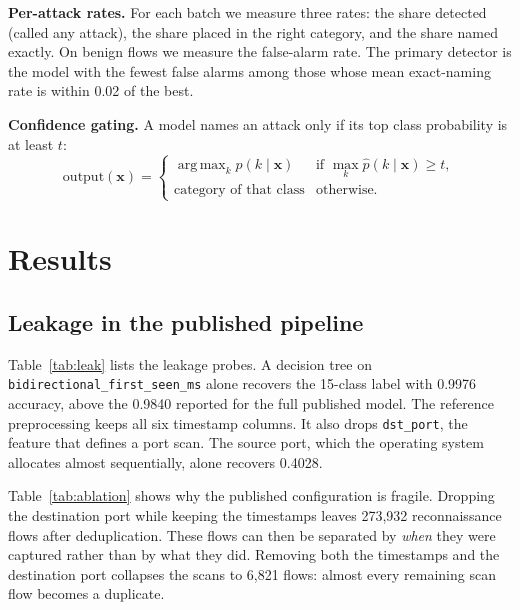 \documentclass[conference]{IEEEtran}
\newcommand{\col}[1]{\texttt{\small #1}}
\DeclareMathOperator*{\argmax}{arg\,max}
\begin{document}
\textbf{Per-attack rates.} For each batch we measure three rates: the share detected (called any attack), the share placed in the right category, and the share named exactly. On benign flows we measure the false-alarm rate. The primary detector is the model with the fewest false alarms among those whose mean exact-naming rate is within 0.02 of the best.

\textbf{Confidence gating.} A model names an attack only if its top class probability is at least $t$:
\begin{equation}
\text{output}(\mathbf{x}) =
\begin{cases}
\argmax_k \hat{p}(k\mid\mathbf{x}) & \text{if } \max_k \hat{p}(k\mid\mathbf{x}) \ge t,\\
\text{category of that class} & \text{otherwise.}
\end{cases}
\label{eq:gate}
\end{equation}

\section{Results}
\label{sec:results}

\subsection{Leakage in the published pipeline}

Table~\ref{tab:leak} lists the leakage probes. A decision tree on \col{bidirectional\_first\_seen\_ms} alone recovers the 15-class label with 0.9976 accuracy, above the 0.9840 reported for the full published model. The reference preprocessing keeps all six timestamp columns. It also drops \col{dst\_port}, the feature that defines a port scan. The source port, which the operating system allocates almost sequentially, alone recovers 0.4028.

Table~\ref{tab:ablation} shows why the published configuration is fragile. Dropping the destination port while keeping the timestamps leaves 273,932 reconnaissance flows after deduplication. These flows can then be separated by \emph{when} they were captured rather than by what they did. Removing both the timestamps and the destination port collapses the scans to 6,821 flows: almost every remaining scan flow becomes a duplicate.
\end{document}
